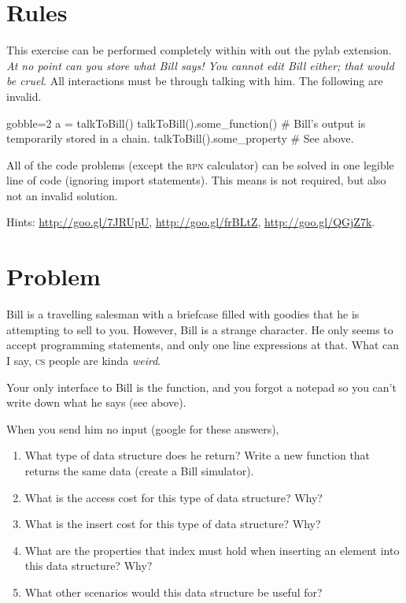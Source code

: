 \documentclass[10pt, letterpaper, acro-macros]{python-problem}
\date{}
\begin{document}
\maketitle

\section*{Rules}

This exercise can be performed completely within  with out the
pylab extension. \emph{At no point can you store what Bill says! You cannot
edit Bill either; that would be cruel}. All interactions must be through
talking with him. The following are invalid.

\begin{pycode*}{gobble=2}
  a = talkToBill()
  talkToBill().some_function() # Bill's output is temporarily stored in a chain.
  talkToBill().some_property   # See above.
\end{pycode*}

All of the code problems (except the \textsc{rpn} calculator) can be solved
in one legible line of code (ignoring import statements). This means
 is not required, but also not an invalid solution.

Hints: \url{http://goo.gl/7JRUpU},
\url{http://goo.gl/frBLtZ}, \url{http://goo.gl/QGjZ7k}.


\section*{Problem}

Bill is a travelling salesman with a briefcase filled with goodies that he
is attempting to sell to you. However, Bill is a strange character. He only
seems to accept programming statements, and only one line expressions at
that. What can I say, \textsc{cs} people are kinda \emph{weird}.

Your only interface to Bill is the  function, and you
forgot a notepad so you can't write down what he says (see above).

When you send him no input (google for these answers),

\begin{enumerate}
  \item What type of data structure does he return? Write a new function
    that returns the same data (create a Bill simulator).
  \item What is the access cost for this type of data structure? Why?
  \item What is the insert cost for this type of data structure? Why?
  \item What are the properties that index must hold when
    inserting an element into this data structure? Why?
  \item What other scenarios would this data structure be useful for?
\end{enumerate}
\end{document}
